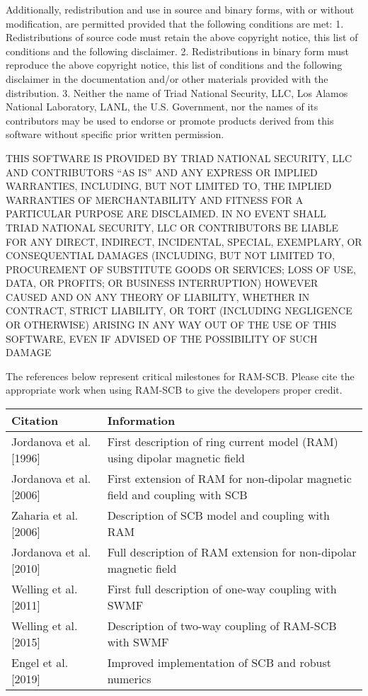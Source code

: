 Additionally, redistribution and use in source and binary forms, with or without modification, are permitted provided that the following conditions are met:
1. Redistributions of source code must retain the above copyright notice, this list of conditions and the following disclaimer.
2. Redistributions in binary form must reproduce the above copyright notice, this list of conditions and the following disclaimer in the documentation and/or other materials provided with the distribution.
3. Neither the name of Triad National Security, LLC, Los Alamos National Laboratory, LANL, the U.S. Government, nor the names of its contributors may be used to endorse or promote products derived from this software without specific prior written permission.

THIS SOFTWARE IS PROVIDED BY TRIAD NATIONAL SECURITY, LLC AND CONTRIBUTORS ``AS IS'' AND ANY EXPRESS OR IMPLIED WARRANTIES, INCLUDING, BUT NOT LIMITED TO, THE IMPLIED WARRANTIES OF MERCHANTABILITY AND FITNESS FOR A PARTICULAR PURPOSE ARE DISCLAIMED. IN NO EVENT SHALL TRIAD NATIONAL SECURITY, LLC OR CONTRIBUTORS BE LIABLE FOR ANY DIRECT, INDIRECT, INCIDENTAL, SPECIAL, EXEMPLARY, OR CONSEQUENTIAL DAMAGES (INCLUDING, BUT NOT LIMITED TO, PROCUREMENT OF SUBSTITUTE GOODS OR SERVICES; LOSS OF USE, DATA, OR PROFITS; OR BUSINESS INTERRUPTION) HOWEVER CAUSED AND ON ANY THEORY OF LIABILITY, WHETHER IN CONTRACT, STRICT LIABILITY, OR TORT (INCLUDING NEGLIGENCE OR OTHERWISE) ARISING IN ANY WAY OUT OF THE USE OF THIS SOFTWARE, EVEN IF ADVISED OF THE POSSIBILITY OF SUCH DAMAGE

The references below represent critical milestones for RAM-SCB. Please cite the appropriate work when using RAM-SCB to give the developers proper credit.


\begin{table}[ht]
  \centering
  \begin{tabular}{l|l}
    Citation & Information \\
    \hline
    \hline
    Jordanova et al. [1996] & First description of ring current model (RAM) using dipolar magnetic field \\
    \hline
    Jordanova et al. [2006] & First extension of RAM for non-dipolar magnetic field and coupling with SCB \\
    \hline
    Zaharia et al. [2006] & Description of SCB model and coupling with RAM \\
    \hline
    Jordanova et al. [2010] & Full description of RAM extension for non-dipolar magnetic field \\
    \hline
    Welling et al. [2011] & First full description of one-way coupling with SWMF \\
    \hline
    Welling et al. [2015] & Description of two-way coupling of RAM-SCB with SWMF \\
    \hline
    Engel et al. [2019] & Improved implementation of SCB and robust numerics \\
  \end{tabular}
\end{table}




